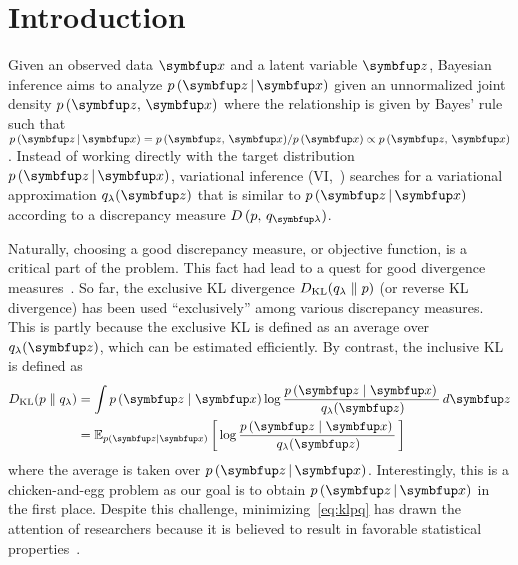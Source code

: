 
\section{Introduction}
Given an observed data \(\vx\) and a latent variable \(\vz\), Bayesian inference aims to analyze \(p\,(\vz\,|\,\vx)\) given an unnormalized joint density \(p\,(\vz,\,\vx)\) where the relationship is given by Bayes' rule such that \(p\,(\vz\,|\,\vx) = {p\,(\vz,\,\vx)}/{p\,(\vx)} \propto p\,(\vz,\,\vx)\).
Instead of working directly with the target distribution \(p\,(\vz\,|\,\vx)\), variational inference (VI,~\citealt{jordan_introduction_1999, blei_variational_2017, zhang_advances_2019}) searches for a variational approximation \(q_{\lambda}(\vz)\) that is similar to \(p\,(\vz\,|\,\vx)\) according to a discrepancy measure \(D\,(p,\, q_{\vlambda})\).

Naturally, choosing a good discrepancy measure, or objective function, is a critical part of the problem.
This fact had lead to a quest for good divergence measures~\citep{NIPS2016_7750ca35, NIPS2017_35464c84, NEURIPS2018_1cd138d0, pmlr-v97-ruiz19a}.
So far, the exclusive KL divergence \(D_{\mathrm{KL}}(q_{\lambda}\parallel p)\) (or reverse KL divergence) has been used ``exclusively'' among various discrepancy measures.
This is partly because the exclusive KL is defined as an average over \(q_{\lambda}(\vz)\), which can be estimated efficiently.
By contrast, the inclusive KL is defined as
%
\begin{align}
  \DKL{p}{q_{\lambda}}
  &= \int p\,(\vz\mid\vx) \log \frac{p\,(\vz\mid\vx)\,}{\,q_{\lambda}(\vz)} \,d\vz \\
  &= \Esub{p(\vz\mid\vx)}{\log \frac{p\,(\vz\mid\vx)\,}{\,q_{\lambda}(\vz)} } \label{eq:klpq}
\end{align}
%
\noindent where the average is taken over \(p\,(\vz\,|\,\vx)\). 
Interestingly, this is a chicken-and-egg problem as our goal is to obtain \(p\,(\vz\,|\,\vx)\) in the first place.
Despite this challenge, minimizing~\eqref{eq:klpq} has drawn the attention of researchers because it is believed to result in favorable statistical properties~\citep{minka2005divergence, mackay_local_2001}.


